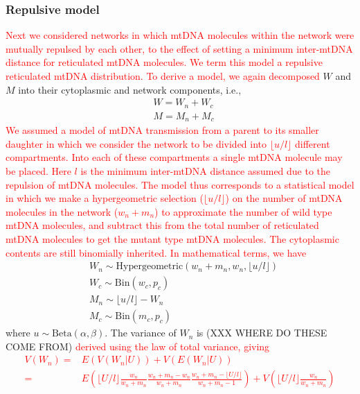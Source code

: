 \documentclass{article}
\newcommand{\be}{\begin{equation}}
\newcommand{\ee}{\end{equation}}
\begin{document}
\begin{appendices}
\subsubsection*{Repulsive model}
\textcolor{red}{Next we considered networks in which mtDNA molecules within the network were mutually repulsed by each other, to the effect of setting a minimum inter-mtDNA distance for reticulated mtDNA molecules. We term this model a repulsive reticulated mtDNA distribution. To derive a model, we again decomposed} $W$ and $M$ into their cytoplasmic and network components, i.e.,
\begin{equation*}
    \begin{split}
        & W = W_n + W_c\\
        & M = M_n + M_c
    \end{split}
\end{equation*}
\textcolor{red}{We assumed a model of mtDNA transmission from a parent to its smaller daughter in which we consider the network to be divided into $\lfloor u/l \rfloor$ different compartments. Into each of these compartments a single mtDNA molecule may be placed. Here $l$ is the minimum inter-mtDNA distance assumed due to the repulsion of mtDNA molecules. The model thus corresponds to a statistical model in which we make a hypergeometric selection ($\lfloor u/l \rfloor$) on the number of mtDNA molecules in the network ($w_n+m_n$) to approximate the number of wild type mtDNA molecules, and subtract this from the total number of reticulated mtDNA molecules to get the mutant type mtDNA molecules. The cytoplasmic contents are still binomially inherited. In mathematical terms, we have}
\be\label{eq:app-model-repel}
    \begin{split}
        & W_n \sim \mathrm{Hypergeometric}(w_n+m_n,w_n,\lfloor u/l \rfloor) \\
        & W_c \sim \mathrm{Bin}\left(w_c,p_c\right) \\
        & M_n \sim \lfloor u/l \rfloor-W_n \\
        & M_c \sim \mathrm{Bin}\left(m_c,p_c\right)
    \end{split}
\ee
where $u\sim\mathrm{Beta}(\alpha,\beta)$. The variance of $W_n$ is (XXX WHERE DO THESE COME FROM) \textcolor{red}{derived using the law of total variance, giving
\begin{equation*}
    \begin{split}
    V(W_n)=&E(V(W_n|U))+V(E(W_n|U))\\
    =&E\left(\lfloor U/l \rfloor\frac{w_n}{w_n+m_n}\frac{w_n+m_n-w_n}{w_n+m_n}\frac{w_n+m_n-\lfloor U/l \rfloor}{w_n+m_n-1}\right)+V\left(\lfloor U/l \rfloor\frac{w_n}{w_n+m_n}\right)\\

\end{split}
\end{equation*}}
\end{appendices}
\end{document}
